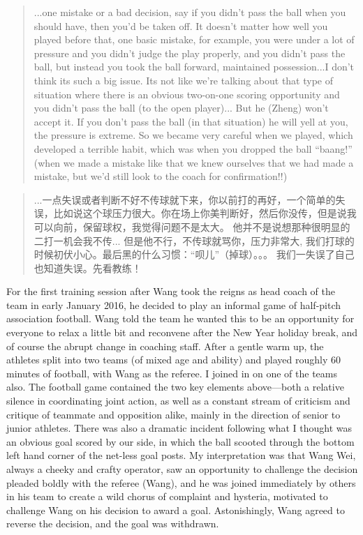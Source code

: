 \begin{CJK}{UTF8}{gbsn}
    \begin{quotation}
      ...one mistake or a bad decision, say if you didn't pass the ball when you should have, then you'd be taken off.  It doesn't matter how well you played before that, one basic mistake, for example, you were under a lot of pressure and you didn't judge the play properly, and you didn't pass the ball, but instead you took the ball forward, maintained possession...I don't think its such a big issue.
      Its not like we're talking about that type of situation where there is an obvious two-on-one scoring opportunity and you didn't pass the ball (to the open player)...
      But he (Zheng) won't accept it.  If you don't pass the ball (in that situation) he will yell at you, the pressure is extreme.  So we became very careful when we played, which developed a terrible habit, which was when you dropped the ball ``baang!'' (when we made a mistake like that we knew ourselves that we had made a mistake, but we'd still look to the coach for confirmation!!)
    \end{quotation}

    \begin{quotation}
      ...一点失误或者判断不好不传球就下来，你以前打的再好，一个简单的失误，比如说这个球压力很大。你在场上你美判断好，然后你没传，但是说我可以向前，保留球权，我觉得问题不是太大。
      他并不是说想那种很明显的二打一机会我不传...
      但是他不行，不传球就骂你，压力非常大, 我们打球的时候初伏小心。最后黑的什么习惯：“呗儿”（掉球）。。。 我们一失误了自己也知道失误。先看教练！
    \end{quotation}





For the first training session after Wang took the reigns as head coach of the team in early January 2016, he decided to play an informal game of half-pitch association football.  Wang told the team he wanted this to be an opportunity for everyone to relax a little bit and reconvene after the New Year holiday break, and of course the abrupt change in coaching staff. After a gentle warm up, the athletes split into two teams (of mixed age and ability) and played roughly 60 minutes of football, with Wang as the referee.  I joined in on one of the teams also.  The football game contained the two key elements above---both a relative silence in coordinating joint action, as well as a constant stream of criticism and critique of teammate and opposition alike, mainly in the direction of senior to junior athletes.  There was also a dramatic incident following what I thought was an obvious goal scored by our side, in which the ball scooted through the bottom left hand corner of the net-less goal posts. My interpretation was that Wang Wei, always a cheeky and crafty operator, saw an opportunity to challenge the decision  pleaded boldly with the referee (Wang), and he was joined immediately by others in his team to create a wild chorus of complaint and hysteria, motivated to challenge Wang on his decision to award a goal.  Astonishingly, Wang agreed to reverse the decision, and the goal was withdrawn.


\end{CJK}
